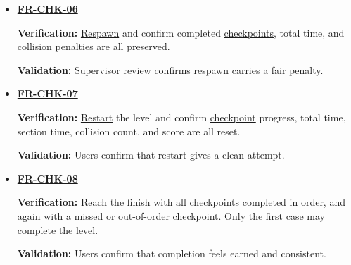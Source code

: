 \documentclass[12pt]{article}
\begin{document}
\begin{itemize}
\item \hyperlink{req:FR-CHK-06}{\textbf{FR-CHK-06}}\par
 \textbf{Verification:} \hyperlink{glos:Respawn}{Respawn} and confirm completed \hyperlink{glos:Checkpoint}{checkpoints}, total
 time, and collision penalties are all preserved.\par
 \textbf{Validation:} Supervisor review confirms \hyperlink{glos:Respawn}{respawn} carries a fair penalty.
\item \hyperlink{req:FR-CHK-07}{\textbf{FR-CHK-07}}\par
 \textbf{Verification:} \hyperlink{glos:Respawn}{Restart} the level and confirm \hyperlink{glos:Checkpoint}{checkpoint} progress,
 total time, section time, collision count, and score are all reset.\par
 \textbf{Validation:} Users confirm that restart gives a clean attempt.
\item \hyperlink{req:FR-CHK-08}{\textbf{FR-CHK-08}}\par
 \textbf{Verification:} Reach the finish with all \hyperlink{glos:Checkpoint}{checkpoints} completed in
 order, and again with a missed or out-of-order \hyperlink{glos:Checkpoint}{checkpoint}. Only the first
 case may complete the level.\par
 \textbf{Validation:} Users confirm that completion feels earned and consistent.
\end{itemize}
\end{document}
